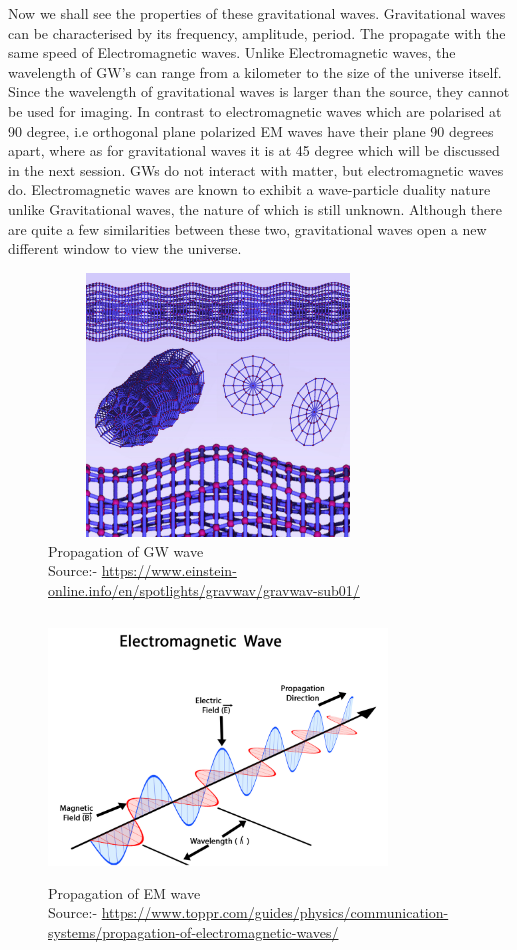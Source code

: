 Now we shall see the properties of these gravitational waves. Gravitational waves can be characterised by its frequency, amplitude, period. The propagate with the same speed of Electromagnetic waves. Unlike Electromagnetic waves, the wavelength of GW’s can range from a kilometer to the size of the universe itself. Since the wavelength of gravitational waves is larger than the source, they cannot be used for imaging. In contrast to electromagnetic waves which are polarised at 90 degree, i.e orthogonal plane polarized EM waves have their plane 90 degrees apart, where as for gravitational waves it is at 45 degree which will be discussed in the next session. GWs do not interact with matter, but electromagnetic waves do. Electromagnetic waves are known to exhibit a wave-particle duality nature unlike Gravitational waves, the nature of which is still unknown. Although there are quite a few similarities between these two, gravitational waves open a new different window to view the universe. \cite{Thorne:1995xs}

\begin{figure}[h]
    \centering
    \includegraphics[height= 7cm, width=9cm]{images.tex/GW_propagation.jpg}
    \caption{Propagation of GW wave\\ Source:- \url{https://www.einstein-online.info/en/spotlights/gravwav/gravwav-sub01/}}
\end{figure}

\begin{figure}[h]
    \centering
    \includegraphics[height= 7cm, width=9cm]{images.tex/EM_propagation.png}
    \caption{Propagation of EM wave\\ Source:- \url{https://www.toppr.com/guides/physics/communication-systems/propagation-of-electromagnetic-waves/}}
\end{figure}

\pagebreak
